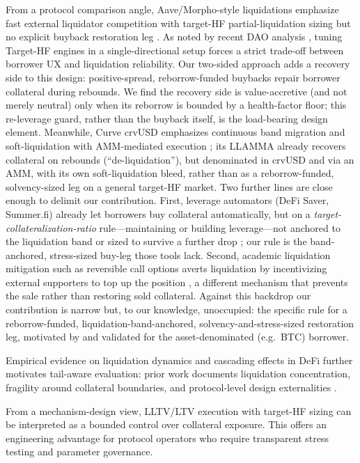 \documentclass[12pt]{article}
\begin{document}
From a protocol comparison angle, Aave/Morpho-style liquidations emphasize fast external liquidator competition with target-HF partial-liquidation sizing but no explicit buyback restoration leg \cite{aave-risk-params,aave-liquidations}. As noted by recent DAO analysis \cite{aave-v4-spoke-revenue}, tuning Target-HF engines in a single-directional setup forces a strict trade-off between borrower UX and liquidation reliability. Our two-sided approach adds a recovery side to this design: positive-spread, reborrow-funded buybacks repair borrower collateral during rebounds. We find the recovery side is value-accretive (and not merely neutral) only when its reborrow is bounded by a health-factor floor; this re-leverage guard, rather than the buyback itself, is the load-bearing design element. Meanwhile, Curve crvUSD emphasizes continuous band migration and soft-liquidation with AMM-mediated execution \cite{curve-crvusd,curve-llamma,egorov2023crvusd}; its LLAMMA already recovers collateral on rebounds (``de-liquidation''), but denominated in crvUSD and via an AMM, with its own soft-liquidation bleed, rather than as a reborrow-funded, solvency-sized leg on a general target-HF market. Two further lines are close enough to delimit our contribution. First, leverage automators (DeFi Saver, Summer.fi) already let borrowers buy collateral automatically, but on a \emph{target-collateralization-ratio} rule---maintaining or building leverage---not anchored to the liquidation band or sized to survive a further drop \cite{defisaver-automation,summerfi-autobuy}; our rule is the band-anchored, stress-sized buy-leg those tools lack. Second, academic liquidation mitigation such as reversible call options averts liquidation by incentivizing external supporters to top up the position \cite{mahmood2023miqado}, a different mechanism that prevents the sale rather than restoring sold collateral. Against this backdrop our contribution is narrow but, to our knowledge, unoccupied: the specific rule for a reborrow-funded, liquidation-band-anchored, solvency-and-stress-sized restoration leg, motivated by and validated for the asset-denominated (e.g.\ BTC) borrower.

Empirical evidence on liquidation dynamics and cascading effects in DeFi further motivates tail-aware evaluation: prior work documents liquidation concentration, fragility around collateral boundaries, and protocol-level design externalities \cite{qin2021liquidations,perez2021knifeedge,gudgeon2020loanable}.

From a mechanism-design view, LLTV/LTV execution with target-HF sizing can be interpreted as a bounded control over collateral exposure. This offers an engineering advantage for protocol operators who require transparent stress testing and parameter governance.
\end{document}
